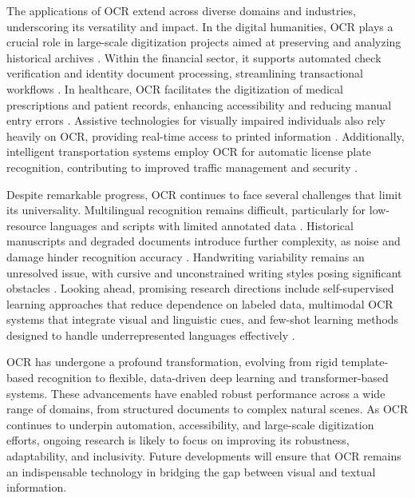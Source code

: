 The applications of OCR extend across diverse domains and industries, underscoring its versatility and impact. In the digital humanities, OCR plays a crucial role in large-scale digitization projects aimed at preserving and analyzing historical archives \cite{holley2009howgood}. Within the financial sector, it supports automated check verification and identity document processing, streamlining transactional workflows \cite{govindaraju1994handwritten}. In healthcare, OCR facilitates the digitization of medical prescriptions and patient records, enhancing accessibility and reducing manual entry errors \cite{zhou2022automatic}. Assistive technologies for visually impaired individuals also rely heavily on OCR, providing real-time access to printed information \cite{anagnostopoulos2006license}. Additionally, intelligent transportation systems employ OCR for automatic license plate recognition, contributing to improved traffic management and security \cite{du2013automatic}.

Despite remarkable progress, OCR continues to face several challenges that limit its universality. Multilingual recognition remains difficult, particularly for low-resource languages and scripts with limited annotated data \cite{smith2007tesseract}. Historical manuscripts and degraded documents introduce further complexity, as noise and damage hinder recognition accuracy \cite{chen2021textrecognition}. Handwriting variability remains an unresolved issue, with cursive and unconstrained writing styles posing significant obstacles \cite{plamondon2000handwriting}. Looking ahead, promising research directions include self-supervised learning approaches that reduce dependence on labeled data, multimodal OCR systems that integrate visual and linguistic cues, and few-shot learning methods designed to handle underrepresented languages effectively \cite{li2023trocr}.

OCR has undergone a profound transformation, evolving from rigid template-based recognition to flexible, data-driven deep learning and transformer-based systems. These advancements have enabled robust performance across a wide range of domains, from structured documents to complex natural scenes. As OCR continues to underpin automation, accessibility, and large-scale digitization efforts, ongoing research is likely to focus on improving its robustness, adaptability, and inclusivity. Future developments will ensure that OCR remains an indispensable technology in bridging the gap between visual and textual information.

